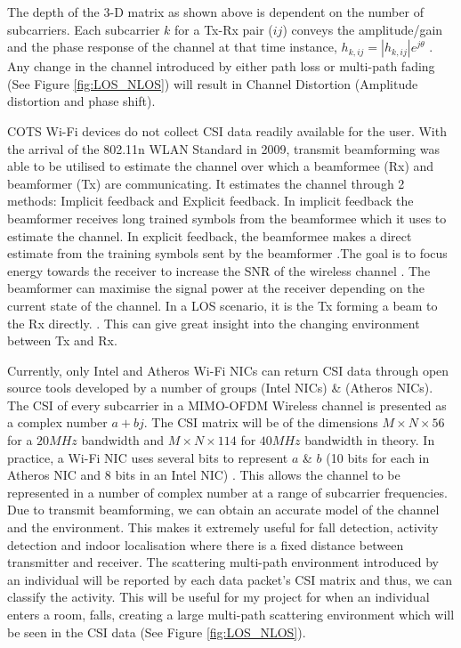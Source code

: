 The depth of the 3-D matrix as shown above is dependent on the number of subcarriers. Each subcarrier $k$ for a Tx-Rx pair ($ij$) conveys the amplitude/gain and the phase response of the channel at that time instance, $h_{k,ij} = |h_{k,ij}|e^{j\theta}$ \citep{OFDM}. Any change in the channel introduced by either path loss or multi-path fading (See Figure \ref{fig:LOS_NLOS}) will result in Channel Distortion (Amplitude distortion and phase shift).\par 
COTS Wi-Fi devices do not collect CSI data readily available for the user. With the arrival of the 802.11n WLAN Standard in 2009, transmit beamforming was able to be utilised to estimate the channel over which a beamformee (Rx) and beamformer (Tx) are communicating. It estimates the channel through 2 methods: Implicit feedback and Explicit feedback. In implicit feedback the beamformer receives long trained symbols from the beamformee which it uses to estimate the channel. In explicit feedback, the beamformee makes a direct estimate from the training symbols sent by the beamformer \citep{full802.11nStandard}.The goal is to focus energy towards the receiver to increase the SNR of the wireless channel \citep{beamforming}. The beamformer can maximise the signal power at the receiver depending on the current state of the channel. In a LOS scenario, it is the Tx forming a beam to the Rx directly. \citep{beamforming}. This can give great insight into the changing environment between Tx and Rx. \par
Currently, only Intel and Atheros Wi-Fi NICs can return CSI data through open source tools developed by a number of groups \cite{Halperin_csitool} (Intel NICs) \& \cite{Xie:2015:PPD:2789168.2790124} (Atheros NICs). The CSI of every subcarrier in a MIMO-OFDM Wireless channel is presented as a complex number $a+bj$. The CSI matrix will be of the dimensions $M\times N\times 56$ for a $20MHz$ bandwidth and $M\times N\times 114$ for $40MHz$ bandwidth in theory. In practice, a Wi-Fi NIC uses several bits to represent $a$ \& $b$ (10 bits for each in Atheros NIC and 8 bits in an Intel NIC) \citep{Xie:2015:PPD:2789168.2790124}. This allows the channel to be represented in a number of complex number at a range of subcarrier frequencies. Due to transmit beamforming, we can obtain an accurate model of the channel and the environment. This makes it extremely useful for fall detection, activity detection and indoor localisation where there is a fixed distance between transmitter and receiver. The scattering multi-path environment introduced by an individual will be reported by each data packet's CSI matrix and thus, we can classify the activity. This will be useful for my project for when an individual enters a room, falls, creating a large multi-path scattering environment which will be seen in the CSI data (See Figure \ref{fig:LOS_NLOS}).

